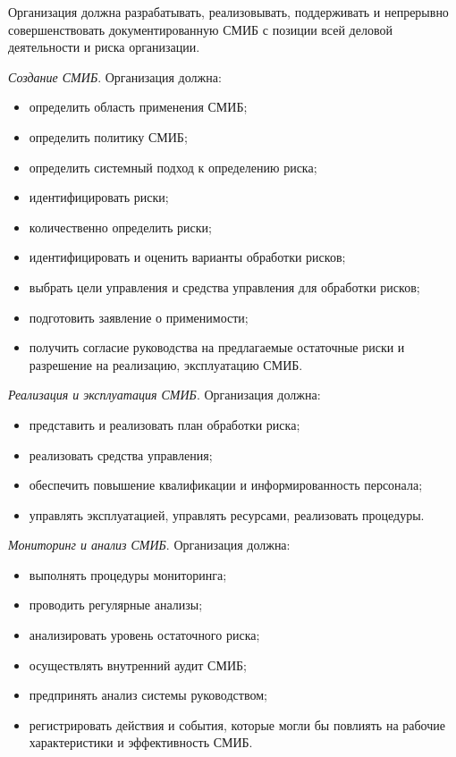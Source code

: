 \documentclass[12pt, russian, oneside, article]{ncc}
\begin{document}
Организация должна разрабатывать, реализовывать, поддерживать и непрерывно совершенствовать документированную СМИБ с позиции всей деловой деятельности и риска организации.

\emph{Создание СМИБ}. Организация должна:
\begin{itemize}
\item определить область применения СМИБ;
\item определить политику СМИБ;
\item определить системный подход к определению риска;
\item идентифицировать риски;
\item количественно определить риски;
\item идентифицировать и оценить варианты обработки рисков;
\item выбрать цели управления и средства управления для обработки рисков;
\item подготовить заявление о применимости;
\item получить согласие руководства на предлагаемые остаточные риски и разрешение на реализацию, эксплуатацию СМИБ.
\end{itemize}

\emph{Реализация и эксплуатация СМИБ}. Организация должна:
\begin{itemize}
\item представить и реализовать план обработки риска;
\item реализовать средства управления;
\item обеспечить повышение квалификации и информированность персонала;
\item управлять эксплуатацией, управлять ресурсами, реализовать процедуры.
\end{itemize}

\emph{Мониторинг и анализ СМИБ}. Организация должна:
\begin{itemize}
\item выполнять процедуры мониторинга;
\item проводить регулярные анализы;
\item анализировать уровень остаточного риска;
\item осуществлять внутренний аудит СМИБ;
\item предпринять анализ системы руководством;
\item регистрировать действия и события, которые могли бы повлиять на рабочие характеристики и эффективность СМИБ.
\end{itemize}
\end{document}
